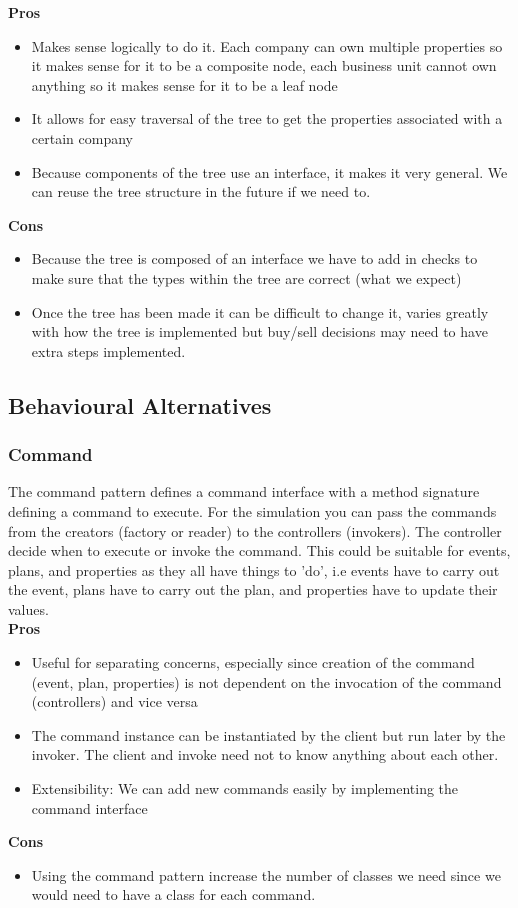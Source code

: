 \documentclass{article}
\begin{document}
\noindent
\textbf{Pros}
\begin{itemize}
    \item Makes sense logically to do it. Each company can own multiple properties so it makes sense for it to be a composite node, each business unit cannot own anything so it makes sense for it to be a leaf node
    \item It allows for easy traversal of the tree to get the properties associated with a certain company
    \item Because components of the tree use an interface, it makes it very general. We can reuse the tree structure in the future if we need to.
\end{itemize}
\textbf{Cons}
\begin{itemize}
    \item Because the tree is composed of an interface we have to add in checks to make sure that the types within the tree are correct (what we expect)
    \item Once the tree has been made it can be difficult to change it, varies greatly with how the tree is implemented but buy/sell decisions may need to have extra steps implemented.
\end{itemize}

\subsection*{Behavioural Alternatives}


\subsubsection*{Command}

The command pattern defines a command interface with a method signature defining a command to execute. For the simulation you can pass the commands from the creators (factory or reader) to the controllers (invokers). The controller decide when to execute or invoke the command. This could be suitable for events, plans, and properties as they all have things to 'do', i.e events have to carry out the event, plans have to carry out the plan, and properties have to update their values.\\


\noindent
\textbf{Pros}
\begin{itemize}
    \item Useful for separating concerns, especially since creation of the command (event, plan, properties) is not dependent on the invocation of the command (controllers) and vice versa
    \item The command instance can be instantiated by the client but run later by the invoker. The client and invoke need not to know anything about each other.
    \item Extensibility: We can add new commands easily by implementing the command interface
\end{itemize}
\textbf{Cons}
\begin{itemize}
    \item Using the command pattern increase the number of classes we need since we would need to have a class for each command.
\end{itemize}
\end{document}
